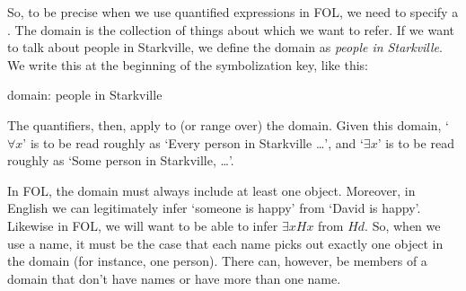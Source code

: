 So, to be precise when we use quantified expressions in FOL, we need to specify a . The domain is the collection of things about which we want to refer. If we want to talk about people in Starkville, we define the domain as \textit{people in Starkville}. We write this at the beginning of the symbolization key, like this:

\begin{earg}
\item[] domain: people in Starkville
\end{earg}
The quantifiers, then, apply to (or range over) the domain. Given this domain, ‘$\forall x$’ is to be read roughly as ‘Every person in Starkville \ldots ’, and ‘$\exists x$’ is to be read roughly as ‘Some person in Starkville, \ldots ’.

In FOL, the domain must always include at least one object. Moreover, in English we can legitimately infer ‘someone is happy’ from ‘David is happy’. Likewise in FOL, we will want to be able to infer $\exists xHx$ from $Hd$. So, when we use a name, it must be the case that each name picks out exactly one object in the domain (for instance, one person). There can, however, be members of a domain that don't have names or have more than one name.
